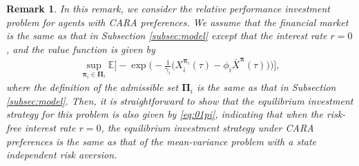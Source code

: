 \documentclass[11pt]{article}
\newtheorem{remark}{Remark}[section]
\numberwithin{equation}{section}
\newcommand{\bpi}{\boldsymbol{\pi}}
\begin{document}
	
	\begin{remark}
		In this remark, we consider the relative performance investment problem for agents with CARA preferences. We assume that the financial market is the same as that in Subsection \ref{subsec:model} except that the interest rate \(r = 0\), and the value function is given by
		\begin{align}
			\sup_{\bpi_i\in\bm{\Pi}_i}\mathbb{E}\Bigg[-\exp\Bigg(-\frac{1}{\gamma_i}\Big(X^{\bpi_i}_{i}(\tau)-\phi_i\bar{X}^{\bpi}(\tau)\Big)\Bigg)\Bigg],
		\end{align}
		where the definition of the admissible set \(\bm{\Pi}_i\) is the same as that in Subsection \ref{subsec:model}.
		Then, it is straightforward to show that the equilibrium investment strategy for this problem is also given by \eqref{eq:01pi},
		indicating that when the risk-free interest rate $r=0$, the equilibrium investment strategy under CARA preferences is the same as that of the mean-variance problem with a state independent risk aversion.
	\end{remark}
	
\end{document}
